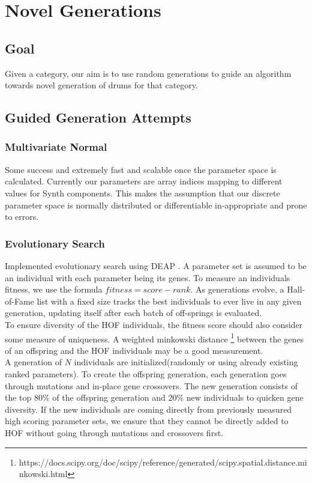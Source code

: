 \documentclass{article}
\begin{document}
\section{Novel Generations}
\subsection{Goal}
 Given a category, our aim is to use random generations to guide an algorithm towards novel generation of drums for that category.

\subsection{Guided Generation Attempts}

\subsubsection{Multivariate Normal}
Some success and extremely fast and scalable once the parameter space is calculated. Currently our parameters are array indices mapping to different values for Synth components. This makes the assumption that our discrete parameter space is normally distributed or differentiable in-appropriate and prone to errors. 

\subsubsection{Evolutionary Search}
Implemented evolutionary search using DEAP \citep{DEAP_JMLR2012}. A parameter set is assumed to be an individual with each parameter being its genes. To measure an individuals fitness, we use the formula $fitness=score-rank$. As generations evolve, a Hall-of-Fame list with a fixed size tracks the best individuals to ever live in any given generation, updating itself after each batch of off-springs is evaluated.\\
To ensure diversity of the HOF individuals, the fitness score should also consider some measure of uniqueness. A weighted minkowski distance \footnote{https://docs.scipy.org/doc/scipy/reference/generated/scipy.spatial.distance.minkowski.html} between the genes of an offspring and the HOF individuals may be a good measurement. \\
A generation of $N$ individuals are initialized(randomly or using already existing ranked parameters). To create the offspring generation, each generation goes through mutations and in-place gene crossovers. The new generation consists of the top 80\% of the offspring generation and 20\% new individuals to quicken gene diversity. If the new individuals are coming directly from previously measured high scoring parameter sets, we ensure that they cannot be directly added to HOF without going through mutations and crossovers first. 
\end{document}
